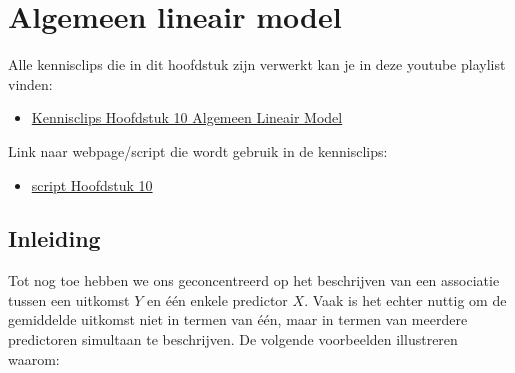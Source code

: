 \documentclass[
  12pt,dutch,coursenotes]{book}
\providecommand{\tightlist}{%
  \setlength{\itemsep}{0pt}\setlength{\parskip}{0pt}}
\theoremstyle{definition}
\theoremstyle{definition}
\theoremstyle{definition}
\theoremstyle{definition}
\theoremstyle{remark}
\begin{document}
\hypertarget{chap-glm}{%
\chapter{Algemeen lineair model}\label{chap-glm}}

Alle kennisclips die in dit hoofdstuk zijn verwerkt kan je in deze youtube playlist vinden:

\begin{itemize}
\tightlist
\item
  \href{https://www.youtube.com/playlist?list=PLZH1hP8_LbJLuEaRpvAkW7oQLCCjHqUS4}{Kennisclips Hoofdstuk 10 Algemeen Lineair Model}
\end{itemize}

Link naar webpage/script die wordt gebruik in de kennisclips:

\begin{itemize}
\tightlist
\item
  \href{https://statomics.github.io/sbc21/rmd/10-MultipleRegression.html}{script Hoofdstuk 10}
\end{itemize}

\hypertarget{inleiding-9}{%
\section{Inleiding}\label{inleiding-9}}

Tot nog toe hebben we ons geconcentreerd op het beschrijven van een
associatie tussen een uitkomst \(Y\) en één enkele predictor \(X\).
Vaak is het echter nuttig om de gemiddelde uitkomst niet in termen van
één, maar in termen van meerdere predictoren simultaan te beschrijven.
De volgende voorbeelden illustreren waarom:
\end{document}

